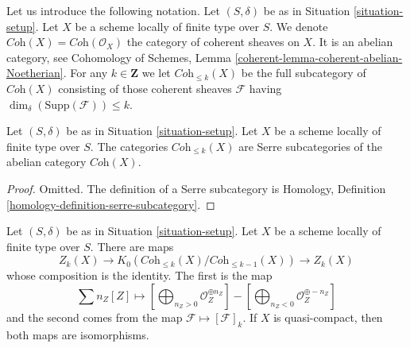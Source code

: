 \medskip\noindent
Let us introduce the following notation.
Let $(S, \delta)$ be as in Situation \ref{situation-setup}.
Let $X$ be a scheme locally of finite type over $S$.
We denote $\textit{Coh}(X) = \textit{Coh}(\mathcal{O}_X)$
the category of coherent sheaves on $X$.
It is an abelian category, see
Cohomology of Schemes, Lemma \ref{coherent-lemma-coherent-abelian-Noetherian}.
For any $k \in \mathbf{Z}$ we let $\textit{Coh}_{\leq k}(X)$
be the full subcategory of $\textit{Coh}(X)$
consisting of those coherent sheaves $\mathcal{F}$
having $\dim_\delta(\text{Supp}(\mathcal{F})) \leq k$.

\begin{lemma}
\label{lemma-Serre-subcategories}
Let $(S, \delta)$ be as in Situation \ref{situation-setup}.
Let $X$ be a scheme locally of finite type over $S$.
The categories $\textit{Coh}_{\leq k}(X)$ are Serre subcategories
of the abelian category $\textit{Coh}(X)$.
\end{lemma}

\begin{proof}
Omitted. The definition of a Serre subcategory is
Homology, Definition \ref{homology-definition-serre-subcategory}.
\end{proof}

\begin{lemma}
\label{lemma-cycles-k-group}
Let $(S, \delta)$ be as in Situation \ref{situation-setup}.
Let $X$ be a scheme locally of finite type over $S$.
There are maps
$$
Z_k(X)
\longrightarrow
K_0(\textit{Coh}_{\leq k}(X)/\textit{Coh}_{\leq k - 1}(X))
\longrightarrow
Z_k(X)
$$
whose composition is the identity. The first is the map
$$
\sum n_Z[Z] \mapsto
\left[\bigoplus\nolimits_{n_Z > 0} \mathcal{O}_Z^{\oplus n_Z}\right]
-
\left[\bigoplus\nolimits_{n_Z < 0} \mathcal{O}_Z^{\oplus -n_Z}\right]
$$
and the second comes from the map $\mathcal{F} \mapsto [\mathcal{F}]_k$.
If $X$ is quasi-compact, then both maps are isomorphisms.
\end{lemma}

